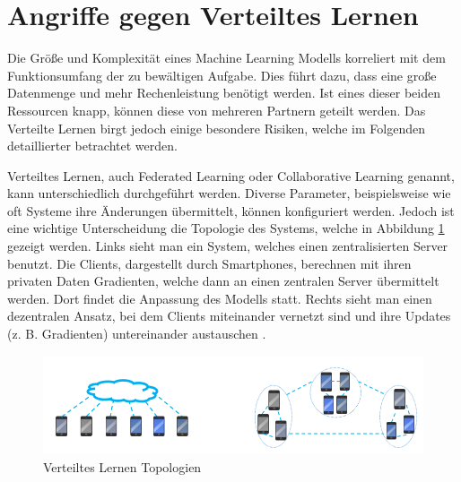 \section{Angriffe gegen Verteiltes Lernen}\label{sec:angriffe_verteiltes_lernen}

Die Größe und Komplexität eines Machine Learning Modells korreliert mit dem Funktionsumfang der zu bewältigen Aufgabe.
Dies führt dazu, dass eine große Datenmenge und mehr Rechenleistung benötigt werden.
Ist eines dieser beiden Ressourcen knapp, können diese von mehreren Partnern geteilt werden.
Das Verteilte Lernen birgt jedoch einige besondere Risiken, welche im Folgenden detaillierter betrachtet werden.


Verteiltes Lernen, auch Federated Learning oder Collaborative Learning genannt, kann unterschiedlich durchgeführt werden. 
Diverse Parameter, beispielsweise wie oft Systeme ihre Änderungen übermittelt, können konfiguriert werden.
Jedoch ist eine wichtige Unterscheidung die Topologie des Systems, welche in Abbildung \ref{fig:federated_learning_topo} gezeigt werden.
Links sieht man ein System, welches einen zentralisierten Server benutzt. 
Die Clients, dargestellt durch Smartphones, berechnen mit ihren privaten Daten Gradienten, welche dann an einen zentralen Server übermittelt werden. 
Dort findet die Anpassung des Modells statt.
Rechts sieht man einen dezentralen Ansatz, bei dem Clients miteinander vernetzt sind und ihre Updates (z. B. Gradienten) untereinander austauschen \cite{P-89}. 

\begin{figure}[!htb]
    \centering
    \includegraphics[width=12cm]{figures/federated_learning}
    \caption{Verteiltes Lernen Topologien \cite{P-89}}
    \label{fig:federated_learning_topo}
\end{figure} 

